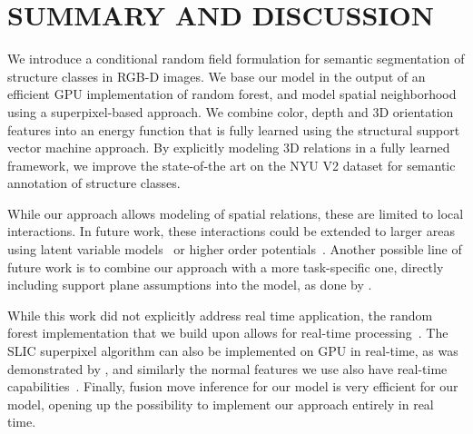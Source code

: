 \documentclass[a4paper, 10pt, conference]{ieeeconf}      %
\begin{document}
\section{SUMMARY AND DISCUSSION}
We introduce a conditional random field formulation for semantic segmentation
of structure classes in RGB-D images. We base our model in the output of an efficient GPU implementation
of random forest, and model spatial neighborhood using a superpixel-based approach.
We combine color, depth and 3D orientation features into an energy function that is fully learned using 
 the structural support vector machine approach.  By explicitly modeling 3D
 relations in a fully learned framework, we improve the state-of-the art on the
 NYU V2 dataset for semantic annotation of structure classes.


While our approach allows modeling of spatial relations, these are limited to
local interactions. In future work, these interactions could be extended to
larger areas using latent variable models~\citep{dann2012pottics} or higher
order potentials~\citep{kohli2009robust}.
Another possible line of future work is to combine our approach with a more
task-specific one, directly including support plane assumptions into the model, as done by
\citet{SilbermanECCV12}.

While this work did not explicitly address real time application, the random
forest implementation that we build upon allows for real-time
processing~\citep{stueckler2013}. The SLIC superpixel algorithm can also be
implemented on GPU in real-time, as was demonstrated by \citep{ren2011gslic}, and similarly
the normal features we use also have
real-time capabilities~\citep{holz_2011_robocup}.
Finally, fusion move inference for our model is very efficient for our model,
opening up the possibility to implement our approach entirely in real time.

\printbibliography{}
\end{document}
